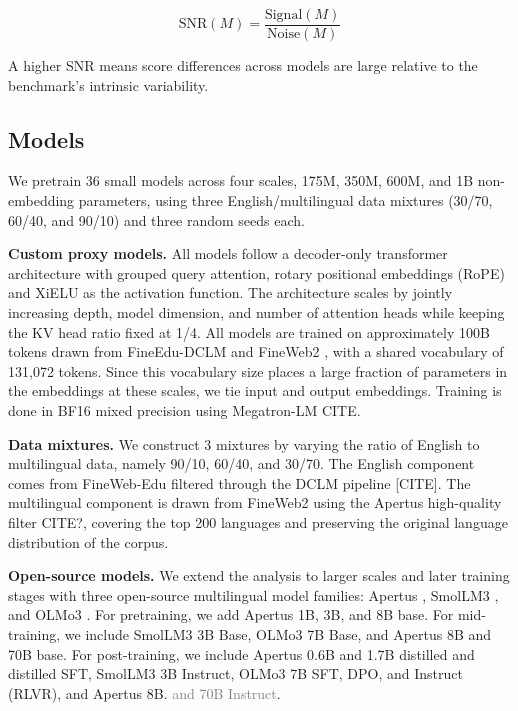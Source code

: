 \documentclass{article}
\newcommand{\futurework}[1]{\textcolor{gray}{#1}}
\begin{document}
$$\text{SNR}(M) = \frac{\text{Signal}(M)}{\text{Noise}(M)}$$

A higher SNR means score differences across models are large relative to the benchmark's intrinsic variability.



\subsection{Models}
\label{subsec:methodology-models}

We pretrain 36 small models across four scales, 175M, 350M, 600M, and 1B non-embedding parameters, using three English/multilingual data mixtures (30/70, 60/40, and 90/10) and three random seeds each.

\textbf{Custom proxy models.} 
All models follow a decoder-only transformer architecture with grouped query attention, rotary positional embeddings (RoPE) and XiELU as the activation function. The architecture scales by jointly increasing depth, model dimension, and number of attention heads while keeping the KV head ratio fixed at 1/4. All models are trained on approximately 100B tokens drawn from FineEdu-DCLM and FineWeb2 \citep{penedo2025fineweb2pipelinescale}, with a shared vocabulary of 131,072 tokens. Since this vocabulary size places a large fraction of parameters in the embeddings at these scales, we tie input and output embeddings. Training is done in BF16 mixed precision using Megatron-LM CITE.


\textbf{Data mixtures.} We construct 3 mixtures by varying the ratio of English to multilingual data, namely 90/10, 60/40, and 30/70. The English component comes from FineWeb-Edu \citep{lozhkov2024fineweb-edu} filtered through the DCLM pipeline [CITE]. The multilingual component is drawn from FineWeb2 \citep{penedo2025fineweb2pipelinescale} using the Apertus high-quality filter CITE?, covering the top 200 languages and preserving the original language distribution of the corpus.

\textbf{Open-source models.} We extend the analysis to larger scales and later training stages with three open-source multilingual model families: Apertus \citep{apertus2025apertusdemocratizingopencompliant}, SmolLM3 \citep{bakouch2025smollm3}, and OLMo3 \citep{olmo2025olmo3}. For pretraining, we add Apertus 1B, 3B, and 8B base. For mid-training, we include SmolLM3 3B Base, OLMo3 7B Base, and Apertus 8B and 70B base. For post-training, we include Apertus 0.6B and 1.7B distilled and distilled SFT, SmolLM3 3B Instruct, OLMo3 7B SFT, DPO, and Instruct (RLVR), and Apertus 8B. \futurework{and 70B Instruct}.
\end{document}
